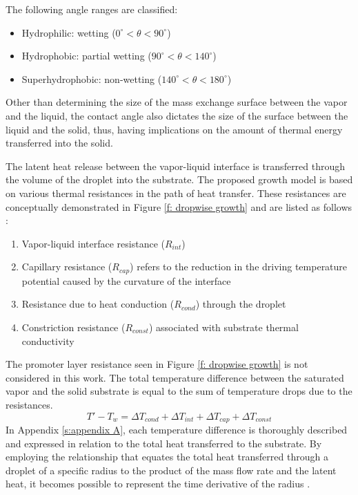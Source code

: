 \documentclass[12pt]{article}
\numberwithin{equation}{section}
\begin{document}
\noindent
The following angle ranges are classified:
\begin{itemize}
    \item Hydrophilic: wetting ($0^\circ<\theta<90^\circ$)
    \item Hydrophobic: partial wetting ($90^\circ<\theta<140^\circ$)
    \item Superhydrophobic: non-wetting ($140^\circ<\theta<180^\circ$)
\end{itemize}
Other than determining the size of the mass exchange surface between the vapor and the liquid, the contact angle also dictates the size of the surface between the liquid and the solid, thus, having implications on the amount of thermal energy transferred into the solid.

The latent heat release between the vapor-liquid interface is transferred through the volume of the droplet into the substrate. The proposed growth model is based on various thermal resistances in the path of heat transfer. These resistances are conceptually demonstrated in Figure \ref{f: dropwise growth} and are listed as follows \cite{khandekar2020drop}:
\begin{enumerate}
    \item Vapor-liquid interface resistance ($R_{int}$)
    \item Capillary resistance ($R_{cap}$) refers to the reduction in the driving temperature potential caused by the curvature of the interface
    \item Resistance due to heat conduction ($R_{cond}$) through the droplet 
    \item Constriction resistance ($R_{const}$) associated with substrate thermal conductivity 
\end{enumerate}
The promoter layer resistance seen in Figure \ref{f: dropwise growth} is not considered in this work.
The total temperature difference between the saturated vapor and the solid substrate is equal to the sum of temperature drops due to the resistances.
\begin{equation}
    T'-T_w=\Delta T_{cond}+\Delta T_{int}+\Delta T_{cap}+\Delta T_{const}
\end{equation}
In Appendix \ref{s:appendix A}, each temperature difference is thoroughly described and expressed in relation to the total heat transferred to the substrate. By employing the relationship that equates the total heat transferred through a droplet of a specific radius to the product of the mass flow rate and the latent heat, it becomes possible to represent the time derivative of the radius \cite{khandekar2020drop}. 
\end{document}
